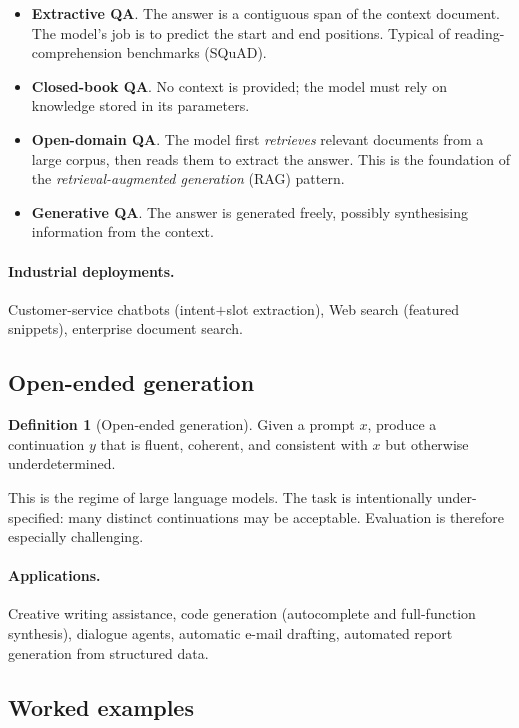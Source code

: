 \documentclass[12pt,a4paper]{report}
\theoremstyle{definition}
\newtheorem{definition}{Definition}[section]
\theoremstyle{remark}
\begin{document}
\begin{itemize}
    \item \textbf{Extractive QA}. The answer is a contiguous span of the context document. The model's job is to predict the start and end positions. Typical of reading-comprehension benchmarks (SQuAD).
    \item \textbf{Closed-book QA}. No context is provided; the model must rely on knowledge stored in its parameters.
    \item \textbf{Open-domain QA}. The model first \emph{retrieves} relevant documents from a large corpus, then reads them to extract the answer. This is the foundation of the \emph{retrieval-augmented generation} (RAG) pattern.
    \item \textbf{Generative QA}. The answer is generated freely, possibly synthesising information from the context.
\end{itemize}

\paragraph{Industrial deployments.} Customer-service chatbots (intent$+$slot extraction), Web search (featured snippets), enterprise document search.

\subsection{Open-ended generation}

\begin{definition}[Open-ended generation]
Given a prompt $x$, produce a continuation $y$ that is fluent, coherent, and consistent with $x$ but otherwise underdetermined.
\end{definition}

This is the regime of large language models. The task is intentionally under-specified: many distinct continuations may be acceptable. Evaluation is therefore especially challenging.

\paragraph{Applications.} Creative writing assistance, code generation (autocomplete and full-function synthesis), dialogue agents, automatic e-mail drafting, automated report generation from structured data.

\subsection{Worked examples}
\end{document}
